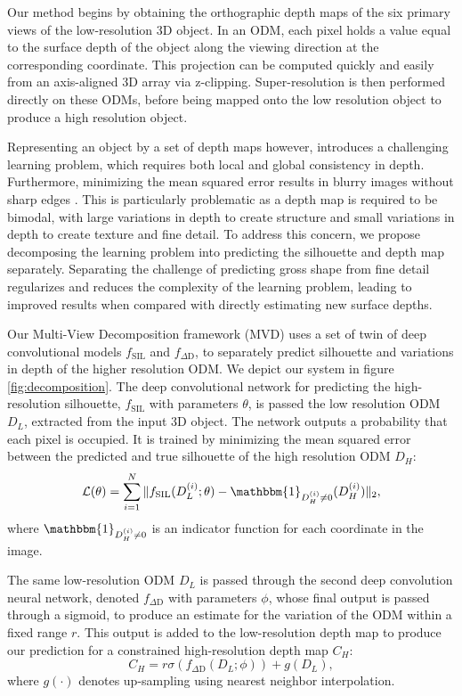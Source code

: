 \documentclass{article}
\begin{document}
Our method begins by obtaining the orthographic depth maps of the six primary views of the low-resolution 3D object. In an ODM, each pixel holds a value equal to the surface depth of the object along the viewing direction at the corresponding coordinate. This projection can be computed quickly and easily from an axis-aligned 3D array via z-clipping. Super-resolution is then performed directly on these ODMs, before being mapped onto the low resolution object to produce a high resolution object. 

Representing an object by a set of depth maps however, introduces a challenging learning problem, which requires both local and global consistency in depth. Furthermore, minimizing the mean squared error results in blurry images without sharp edges \cite{mathieu2015deep,pathak2016context}. This is particularly problematic as a depth map is required to be bimodal, with large variations in depth to create structure and small variations in depth to create texture and fine detail. To address this concern, we propose decomposing the learning problem into predicting the silhouette and depth map separately. Separating the challenge of predicting gross shape from fine detail regularizes and reduces the complexity of the learning problem, leading to improved results when compared with directly estimating new surface depths. 

Our Multi-View Decomposition framework (MVD) uses a set of twin of deep convolutional models $f_{\text{SIL}}$ and $f_{\Delta \text{D}}$, to separately predict silhouette and variations in depth of the higher resolution ODM. We depict our system in figure \ref{fig:decomposition}. The deep convolutional network for predicting the high-resolution silhouette, $f_{\text{SIL}}$ with parameters $\theta$, is passed the low resolution ODM $D_L$, extracted from the input 3D object. The network outputs a probability that each pixel is occupied. It is trained by minimizing the mean squared error between the predicted and true silhouette of the high resolution ODM $D_H$:
\begin{equation}
\mathcal{L}(\theta) = \sum_{i=1}^N \Vert f_{\text{SIL}}(D_L^{(i)}; \theta) - \mathbbm{1}_{D_H^{(i)} \neq 0} (D_H^{(i)}) \Vert_2,
\end{equation}
where $\mathbbm{1}_{D_H^{(i)} \neq 0}$ is an indicator function for each coordinate in the image.

The same low-resolution ODM $D_L$ is passed through the second deep convolution neural network, denoted $f_{\Delta \text{D}}$ with parameters $\phi$, whose final output is passed through a sigmoid, to produce an estimate for the variation of the ODM within a fixed range $r$. This output is added to the low-resolution depth map to produce our prediction for a constrained high-resolution depth map $C_H$: 
\begin{equation}
 C_H = r \sigma(f_{\Delta \text{D}}(D_L; \phi)) + g(D_L),
\end{equation}
where $g(\cdot)$ denotes up-sampling using nearest neighbor interpolation.
 
\end{document}
